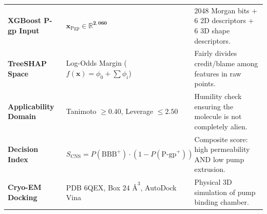 \documentclass[11pt,a4paper]{article}
\begin{document}
\begin{table}[h!]
\begin{tabularx}{\textwidth}{p{4.2cm} p{4.2cm} X}
\textbf{XGBoost P-gp Input} & $\mathbf{x}_{\text{Pgp}} \in \mathbb{R}^{\mathbf{2,060}}$ & 2048 Morgan bits + 6 2D descriptors + 6 3D shape descriptors. \\
\textbf{TreeSHAP Space} & Log-Odds Margin ($f(\mathbf{x}) = \phi_0 + \sum \phi_i$) & Fairly divides credit/blame among features in raw points. \\
\textbf{Applicability Domain} & Tanimoto $\ge 0.40$, Leverage $\le 2.50$ & Humility check ensuring the molecule is not completely alien. \\
\textbf{Decision Index} & $S_{\text{CNS}} = P(\text{BBB}^+) \cdot (1 - P(\text{P-gp}^+))$ & Composite score: high permeability AND low pump extrusion. \\
\textbf{Cryo-EM Docking} & PDB 6QEX, Box $24\text{ \AA}^3$, AutoDock Vina & Physical 3D simulation of pump binding chamber. \\
\bottomrule
\end{tabularx}
\end{table}
\end{document}
